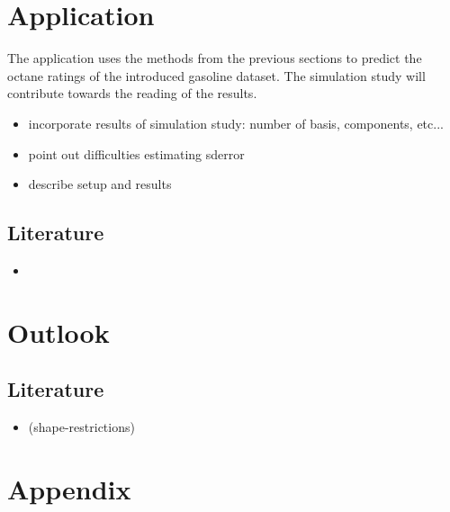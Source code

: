 \documentclass[11pt,twoside,a4paper]{article}
\begin{document}
	\newpage
	\section{Application}
		The application uses the methods from the previous sections to predict the octane ratings of the introduced gasoline dataset. The simulation study will contribute towards the reading of the results. 
		\begin{itemize}
			\item {\color{green} incorporate results of simulation study: 					number of basis, components, etc...}
			\item point out difficulties estimating sderror
			\item describe setup and results
		\end{itemize}
	
	\subsection{Literature}
	\begin{itemize}
		\item \cite{carey_life_2002}
	\end{itemize}

	\section{Outlook}
	
	\subsection{Literature}
	\begin{itemize}
		\item \cite{James.2009} (shape-restrictions)
	\end{itemize}
	
	\newpage
	\section{Appendix}
	
\end{document}
